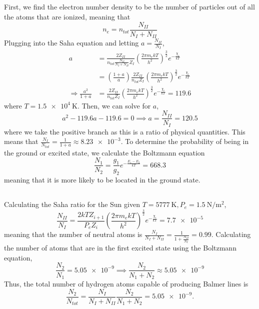 \documentclass{article}
\begin{document}
\subsection{}

First, we find the electron number density to be the number of particles out of all the atoms that are ionized, meaning that
\begin{equation}
    n_e = n_{tot} \frac{N_{II}}{N_I + N_{II}}
\end{equation}
Plugging into the Saha equation and letting \(a = \frac{N_{II}}{N_I}\),
\begin{align}
    a &= \frac{2 Z_{II}}{n_{tot} \frac{N_{II}}{N_I + N_{II}} Z_I} \left(\frac{2 \pi m_e kT}{h^2}\right)^{\frac{3}{2}} e^{-\frac{\chi_i}{kT}} \\
    &= \left(\frac{1 + a}{a}\right) \frac{2 Z_{II}}{n_{tot} Z_I} \left(\frac{2 \pi m_e kT}{h^2}\right)^{\frac{3}{2}} e^{-\frac{\chi_i}{kT}} \\
    \Rightarrow \frac{a^2}{1 + a} &= \frac{2 Z_{II}}{n_{tot} Z_I} \left(\frac{2 \pi m_e kT}{h^2}\right)^{\frac{3}{2}} e^{-\frac{\chi_i}{kT}} = \num{119.6}
\end{align}
where \(T = \SI{1.5e+4}{\kelvin}\).
Then, we can solve for \(a\),
\begin{equation}
    a^2 - \num{119.6} a - \num{119.6} = 0 \implies a = \frac{N_{II}}{N_I} = \num{120.5}
\end{equation}
where we take the positive branch as this is a ratio of physical quantities.
This means that \(\frac{N_I}{N_{tot}} = \frac{1}{1 + a} \approx \num{8.23e-3}\).
To determine the probability of being in the ground or excited state, we calculate the Boltzmann equation
\begin{equation}
    \frac{N_1}{N_2} = \frac{g_1}{g_2} e^{-\frac{E_1 - E_2}{kT}} = \num{668.3}
\end{equation}
meaning that it is more likely to be located in the ground state.

\subsection{}

Calculating the Saha ratio for the Sun given \(T = \SI{5777}{\kelvin}, P_e = \SI{1.5}{\newton\per\meter\squared}\),
\begin{equation}
    \frac{N_{II}}{N_I} = \frac{2 kT Z_{i + 1}}{P_e Z_i} \left(\frac{2 \pi m_e kT}{h^2}\right)^{\frac{3}{2}} e^{-\frac{\chi_i}{kT}} = \num{7.7e-5}
\end{equation}
meaning that the number of neutral atoms is \(\frac{N_I}{N_I + N_{II}} = \frac{1}{1 + \frac{N_{II}}{N_I}} = \num{0.99}\).
Calculating the number of atoms that are in the first excited state using the Boltzmann equation,
\begin{equation}
    \frac{N_2}{N_1} = \num{5.05e-9} \implies \frac{N_2}{N_1 + N_2} \approx \num{5.05e-9}
\end{equation}
Thus, the total number of hydrogen atoms capable of producing Balmer lines is
\begin{equation}
    \frac{N_2}{N_{tot}} = \frac{N_I}{N_I + N_{II}} \frac{N_2}{N_1 + N_2} = \num{5.05e-9}.
\end{equation}
\end{document}
